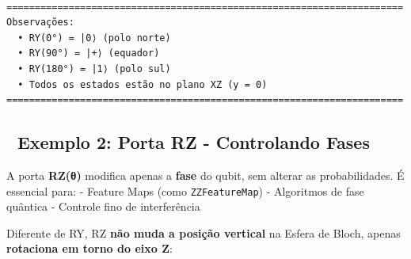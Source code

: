 \documentclass[
  brazilian,
]{report}
\begin{document}
\begin{verbatim}

======================================================================
Observações:
  • RY(0°) = |0⟩ (polo norte)
  • RY(90°) = |+⟩ (equador)
  • RY(180°) = |1⟩ (polo sul)
  • Todos os estados estão no plano XZ (y = 0)
======================================================================
\end{verbatim}

\subsection{🔬 Exemplo 2: Porta RZ - Controlando
Fases}\label{exemplo-2-porta-rz---controlando-fases}

A porta \textbf{RZ(θ)} modifica apenas a \textbf{fase} do qubit, sem
alterar as probabilidades. É essencial para: - Feature Maps (como
\texttt{ZZFeatureMap}) - Algoritmos de fase quântica - Controle fino de
interferência

Diferente de RY, RZ \textbf{não muda a posição vertical} na Esfera de
Bloch, apenas \textbf{rotaciona em torno do eixo Z}:
\end{document}
